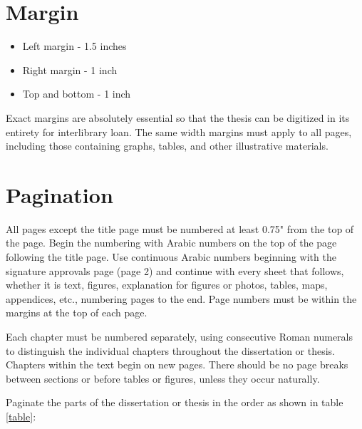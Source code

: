 \section{Margin}

\begin{itemize}
\item Left margin - 1.5 inches
\item Right margin - 1 inch
\item Top and bottom	- 1 inch

\end{itemize}

Exact margins are absolutely essential so that the thesis can be digitized in its entirety for interlibrary loan. The same width margins must apply to all pages, including those containing graphs, tables, and other illustrative materials.

\section{Pagination}

All pages except the title page must be numbered at least 0.75" from the top of the page. Begin the numbering with Arabic numbers on the top of the page following the title page. Use continuous Arabic numbers beginning with the signature approvals page (page 2) and continue with every sheet that follows, whether it is text, figures, explanation for figures or photos, tables, maps, appendices, etc., numbering pages to the end. Page numbers must be within the margins at the top of each page.

Each chapter must be numbered separately, using consecutive Roman numerals to distinguish the individual chapters throughout the dissertation or thesis. Chapters within the text begin on new pages. There should be no page breaks between sections or before tables or figures, unless they occur naturally.

Paginate the parts of the dissertation or thesis in the order as shown in table \ref{table}:


